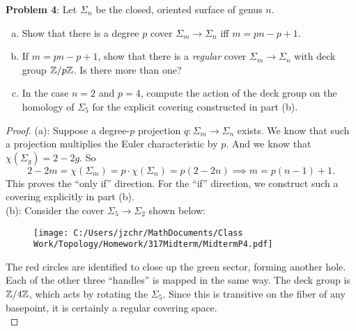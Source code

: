 \documentclass{amsart}
\begin{document}
	\newpage
	\textbf{Problem 4}: Let $\Sigma_n$ be the closed, oriented surface of genus $n$.
	\begin{enumerate}[(a)]
		\item Show that there is a degree $p$ cover $\Sigma_m\to \Sigma_n$ iff $m=pn-p+1$.
		\item If $m=pn-p+1$, show that there is a \textit{regular} cover $\Sigma_m\to \Sigma_n$ with deck group $\mathbb{Z}/p\mathbb{Z}$. Is there more than one?
		\item In the case $n=2$ and $p=4$, compute the action of the deck group on the homology of $\Sigma_5$ for the explicit covering constructed in part (b).
	\end{enumerate}
	\begin{proof}
		(a): Suppose a degree-$p$ projection $q:\Sigma_m\to \Sigma_n$ exists. We know that such a projection multiplies the Euler characteristic by $p$. And we know that $\chi(\Sigma_g)=2-2g$. So
		$$2-2m = \chi(\Sigma_m)= p \cdot \chi(\Sigma_n) = p(2-2n) \implies m = p(n-1)+1.$$
		This proves the ``only if'' direction. For the ``if'' direction, we construct such a covering explicitly in part (b).\\

	(b): Consider the cover $\Sigma_5\to \Sigma_2$ shown below:
	
	\begin{figure}[h]
		\texttt{[image: C:/Users/jzchr/MathDocuments/Class Work/Topology/Homework/317Midterm/MidtermP4.pdf]}
	\end{figure}
	
	The red circles are identified to close up the green sector, forming another hole. Each of the other three ``handles'' is mapped in the same way. The deck group is $\mathbb{Z}/4\mathbb{Z}$, which acts by rotating the $\Sigma_5$. Since this is transitive on the fiber of any basepoint, it is certainly a regular covering space.\\
	

\end{proof}
\end{document}
